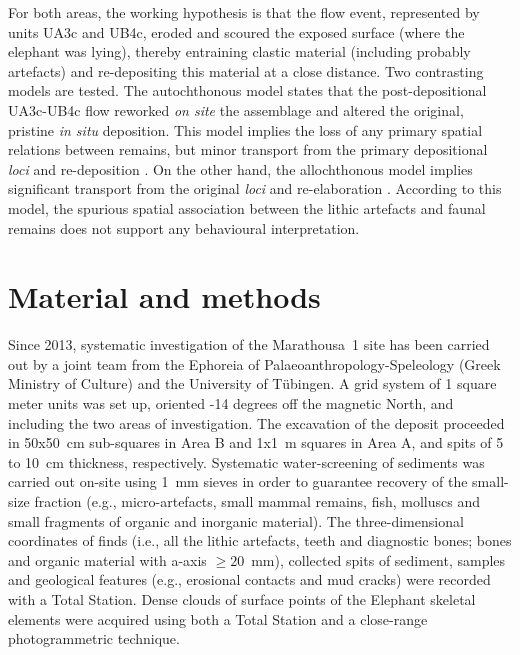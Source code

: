 \documentclass[preprint,authoryear,times]{elsarticle} %
\begin{document}
For both areas, the working hypothesis is that the flow event, represented by units UA3c and UB4c, eroded and scoured the exposed surface (where the elephant was lying), thereby entraining clastic material (including probably artefacts) and re-depositing this material at a close distance. Two contrasting models are tested. The autochthonous model \citep[][sensu]{Dominguez-Rodrigo2012} states that the post-depositional UA3c-UB4c flow reworked \emph{on site} the assemblage and altered the original, pristine \emph{in situ} deposition. This model implies the loss of any primary spatial relations between remains, but minor transport from the primary depositional \emph{loci} and re-deposition \citep[][sensu]{Fernandez-Lopez}. On the other hand, the allochthonous model \citep[][sensu]{Dominguez-Rodrigo2012} implies significant transport from the original \emph{loci} and re-elaboration \citep[][sensu]{Fernandez-Lopez}. According to this model, the spurious spatial association between the lithic artefacts and faunal remains does not support any behavioural interpretation.

\section{Material and methods}

Since 2013, systematic investigation of the Marathousa~1 site has been carried out by a joint team from the Ephoreia of Palaeoanthropology-Speleology (Greek Ministry of Culture) and the University of Tübingen. A grid system of 1 square meter units was set up, oriented -14 degrees off the magnetic North, and including the two areas of investigation. The excavation of the deposit proceeded in 50x50~cm sub-squares in Area B and 1x1~m squares in Area A, and spits of 5 to 10~cm thickness, respectively. Systematic water-screening of sediments was carried out on-site using 1~mm sieves in order to guarantee recovery of the small-size fraction (e.g., micro-artefacts, small mammal remains, fish, molluscs and small fragments of organic and inorganic material). The three-dimensional coordinates of finds (i.e., all the lithic artefacts, teeth and diagnostic bones; bones and organic material with a-axis $\geq20$~mm), collected spits of sediment, samples and geological features (e.g., erosional contacts and mud cracks) were recorded with a Total Station. Dense clouds of surface points of the Elephant skeletal elements were acquired using both a Total Station and a close-range photogrammetric technique. %
\end{document}
